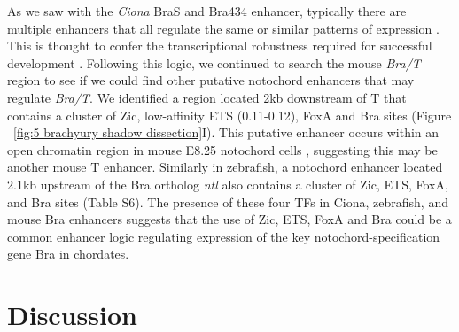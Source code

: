 As we saw with the \textit{Ciona} BraS and Bra434 enhancer, typically there are multiple enhancers that all regulate the same or similar patterns of expression \cite{frankel2010,hong2008,perry2010}. This is thought to confer the transcriptional robustness required for successful development \cite{antosova2016,frankel2010,osterwalder2018,perry2010}. Following this logic, we continued to search the mouse \textit{Bra/T} region to see if we could find other putative notochord enhancers that may regulate \textit{Bra/T}. We identified a region located 2kb downstream of T that contains a cluster of Zic, low-affinity ETS (0.11-0.12), FoxA and Bra sites (Figure ~\ref{fig:5 brachyury shadow dissection}I). This putative enhancer occurs within an open chromatin region in mouse E8.25 notochord cells \cite{pijuan-sala2020}, suggesting this may be another mouse T enhancer. Similarly in zebrafish, a notochord enhancer located 2.1kb upstream of the Bra ortholog \textit{ntl} \cite{harvey2010} also contains a cluster of Zic, ETS, FoxA, and Bra sites (Table S6). The presence of these four TFs in Ciona, zebrafish, and mouse Bra enhancers suggests that the use of Zic, ETS, FoxA and Bra could be a common enhancer logic regulating expression of the key notochord-specification gene Bra in chordates.

\section{Discussion}

